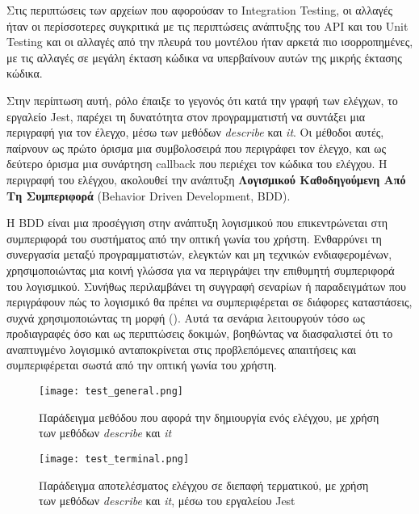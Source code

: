 Στις περιπτώσεις των αρχείων που αφορούσαν το \textlatin{Integration
  Testing}, οι αλλαγές ήταν οι περίσσοτερες συγκριτικά με τις
περιπτώσεις ανάπτυξης του \textlatin{API} και του \textlatin{Unit
  Testing} και οι αλλαγές από την πλευρά του μοντέλου ήταν αρκετά πιο
ισορροπημένες, με τις αλλαγές σε μεγάλη έκταση κώδικα να υπερβαίνουν
αυτών της μικρής έκτασης κώδικα.

Στην περίπτωση αυτή, ρόλο έπαιξε το γεγονός ότι κατά την γραφή των
ελέγχων, το εργαλείο \textlatin{Jest}, παρέχει τη δυνατότητα στον
προγραμματιστή να συντάξει μια περιγραφή για τον έλεγχο, μέσω των
μεθόδων \textit{\textlatin{describe}} και \textit{\textlatin{it}}. Οι
μέθοδοι αυτές, παίρνουν ως πρώτο όρισμα μια συμβολοσειρά που περιγράφει
τον έλεγχο, και ως δεύτερο όρισμα μια συνάρτηση \textlatin{callback}
\cite{crockfordjavascript} που περιέχει τον κώδικα του ελέγχου. Η
περιγραφή του ελέγχου, ακολουθεί την ανάπτυξη \textbf{Λογισμικού
  Καθοδηγούμενη Από Τη Συμπεριφορά} (\textlatin{Behavior Driven
  Development, BDD}).

Η \textlatin{BDD} είναι μια προσέγγιση στην ανάπτυξη λογισμικού που
επικεντρώνεται στη συμπεριφορά του συστήματος από την οπτική γωνία του
χρήστη. Ενθαρρύνει τη συνεργασία μεταξύ προγραμματιστών, ελεγκτών και μη
τεχνικών ενδιαφερομένων, χρησιμοποιώντας μια κοινή γλώσσα για να
περιγράψει την επιθυμητή συμπεριφορά του λογισμικού. Συνήθως
περιλαμβάνει τη συγγραφή σεναρίων ή παραδειγμάτων που περιγράφουν πώς το
λογισμικό θα πρέπει να συμπεριφέρεται σε διάφορες καταστάσεις, συχνά
χρησιμοποιώντας τη μορφή 
(). Αυτά τα σενάρια λειτουργούν τόσο ως
προδιαγραφές όσο και ως περιπτώσεις δοκιμών, βοηθώντας να διασφαλιστεί
ότι το αναπτυγμένο λογισμικό ανταποκρίνεται στις προβλεπόμενες
απαιτήσεις και συμπεριφέρεται σωστά από την οπτική γωνία του χρήστη.
\cite{bddstudy,mughal2024advancingbddsoftwaretesting,bddsystematic}

\begin{figure}[H]
  \begin{center}
    \texttt{[image: test\_general.png]}
    \caption{Παράδειγμα μεθόδου που αφορά την δημιουργία ενός ελέγχου,
      με χρήση των μεθόδων \textit{\textlatin{describe}} και
      \textit{\textlatin{it}}}
  \end{center}
  \label{fig:TestGeneral}
\end{figure}

\begin{figure}[H]
  \begin{center}
    \texttt{[image: test\_terminal.png]}
    \caption{Παράδειγμα αποτελέσματος ελέγχου σε διεπαφή τερματικού, με
      χρήση των μεθόδων \textit{\textlatin{describe}} και
      \textit{\textlatin{it}}, μέσω του εργαλείου \textlatin{Jest}}
  \end{center}
  \label{fig:TestGeneralTerminal}
\end{figure}

